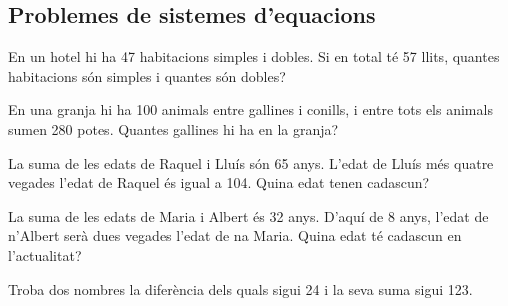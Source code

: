 \subsection{Problemes de sistemes d'equacions}

\begin{mylist}
\exer  En un hotel hi ha 47 habitacions simples i dobles. Si en total té 57 llits, quantes habitacions són simples i quantes són dobles?

\exer  En una granja hi ha 100 animals entre gallines i conills, i entre tots els animals sumen 280 potes. Quantes gallines hi ha en la granja?

\exer  La suma de les edats de Raquel i Lluís són 65 anys. L'edat de Lluís més quatre vegades l'edat de Raquel és igual a 104. Quina edat tenen cadascun?

\exer  La suma de les edats de Maria i Albert és 32 anys. D'aquí de 8 anys, l'edat de n'Albert serà dues vegades l'edat de na Maria. Quina edat té cadascun en l'actualitat?

\exer  Troba dos nombres la diferència dels quals sigui 24 i la seva suma sigui 123.

\end{mylist}



